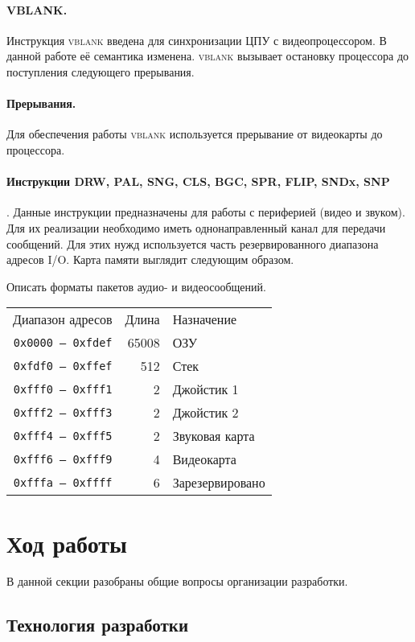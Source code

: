 \paragraph{VBLANK.} Инструкция \textsc{vblank} введена для синхронизации ЦПУ с видеопроцессором. В данной работе её семантика изменена. \textsc{vblank} вызывает остановку процессора до поступления следующего прерывания.

\paragraph{Прерывания.} Для обеспечения работы \textsc{vblank} используется прерывание от видеокарты до процессора.

\paragraph{Инструкции DRW, PAL, SNG, CLS, BGC, SPR, FLIP, SNDx, SNP}. Данные инструкции предназначены для работы с периферией (видео и звуком). Для их реализации необходимо иметь однонаправленный канал для передачи сообщений. Для этих нужд используется  часть резервированного диапазона адресов I/O. Карта памяти выглядит следующим образом.

\todo Описать форматы пакетов аудио- и видеосообщений.

\begin{tabular}{rrl}
Диапазон адресов         & Длина & Назначение \\
\texttt{0x0000 -- 0xfdef}& 65008 & ОЗУ        \\
\texttt{0xfdf0 -- 0xffef}& 512   & Стек       \\
\texttt{0xfff0 -- 0xfff1}& 2     & Джойстик 1 \\
\texttt{0xfff2 -- 0xfff3}& 2     & Джойстик 2 \\
\texttt{0xfff4 -- 0xfff5}& 2     & Звуковая карта \\
\texttt{0xfff6 -- 0xfff9}& 4     & Видеокарта \\
\texttt{0xfffa -- 0xffff}& 6     & Зарезервировано \\
\end{tabular}


\section{Ход работы}

В данной секции разобраны общие вопросы организации разработки.
\subsection{Технология разработки}

